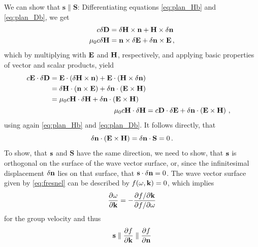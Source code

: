 We can show that $\mathbf{s} \parallel \mathbf{S}$: Differentiating 
equations \eqref{eq:plan_Hb} and \eqref{eq:plan_Db}, we get 
\begin{subequations}
\begin{align}
    c \delta \mathbf{D} &= \delta \mathbf{H} \times \mathbf{n} + \mathbf{H} \times \delta \mathbf{n} \\
    \mu_0 c \delta \mathbf{H} &= \mathbf{n} \times \delta \mathbf{E} + \delta \mathbf{n} \times \mathbf{E} \, ,
\end{align}
\end{subequations}
which by multiplying with $\mathbf{E}$ and $\mathbf{H}$, respectively, and applying 
basic properties of vector and scalar products, yield
\begin{subequations}
\begin{align}
    \begin{split}
    c \mathbf{E} \cdot \delta \mathbf{D} 
    &= \mathbf{E} \cdot \left(\delta \mathbf{H} \times \mathbf{n} \right) + 
        \mathbf{E} \cdot \left(\mathbf{H} \times \delta \mathbf{n} \right) \\
    &= \delta \mathbf{H} \cdot \left(\mathbf{n} \times \mathbf{E} \right) + 
        \delta \mathbf{n} \cdot \left(\mathbf{E} \times \mathbf{H} \right)  \\
    &= \mu_0 c \mathbf{H} \cdot \delta \mathbf{H} + 
        \delta \mathbf{n} \cdot \left(\mathbf{E} \times \mathbf{H} \right)
    \end{split} \\
    \mu_0 c \mathbf{H} \cdot \delta \mathbf{H} &= c \mathbf{D} \cdot \delta \mathbf{E} + 
        \delta \mathbf{n} \cdot \left(\mathbf{E} \times \mathbf{H} \right) \, ,
\end{align}
\end{subequations}
using again \eqref{eq:plan_Hb} and \eqref{eq:plan_Db}. It follows directly, that 
\begin{equation}
    \delta \mathbf{n} \cdot \left( \mathbf{E} \times \mathbf{H} \right) = \delta \mathbf{n} \cdot \mathbf{S} = 0 \, .
\end{equation}
To show, that $\mathbf{s}$ and $\mathbf{S}$ have the same direction, we need to show, 
that $\mathbf{s}$ is orthogonal on the surface of the wave vector surface, or, since 
the infinitesimal displacement $\delta \mathbf{n}$ lies 
on that surface, that $\mathbf{s} \cdot \delta \mathbf{n} = 0$. 
The wave vector surface given by \eqref{eq:fresnel} can be described by 
$f(\omega, \mathbf{k}) = 0$, which implies 
\begin{equation}
    \frac{\partial \omega}{\partial \mathbf{k}} = 
    - \frac{\partial f / \partial \mathbf{k}}{\partial f / \partial \omega}
\end{equation}
for the group velocity and thus 
\begin{equation}
    \mathbf{s} \parallel \frac{\partial f }{\partial \mathbf{k}} \parallel \frac{\partial f}{\partial \mathbf{n}}
    \label{eq:s_dir}
\end{equation}
